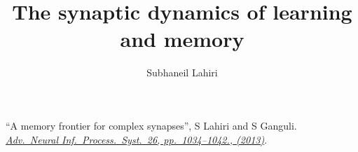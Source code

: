 \documentclass[final]{beamer}%
\title[Complex synapses]{The synaptic dynamics of learning and memory }
\author{Subhaneil Lahiri%
}
\institute[Stanford]{%
Stanford University, Applied Physics
}
\begin{document}

\begin{frame}
%
 \titlepage

 \vp%
``A memory frontier for complex synapses'',
S Lahiri and S Ganguli.
\\%
\href{https://papers.nips.cc/paper/4872-a-memory-frontier-for-complex-synapses}
{\emph{Adv.\ Neural Inf.\ Process.\ Syst.\ 26, pp.~1034--1042., (2013)}}.

%
\end{frame}


%
%

\end{document}
